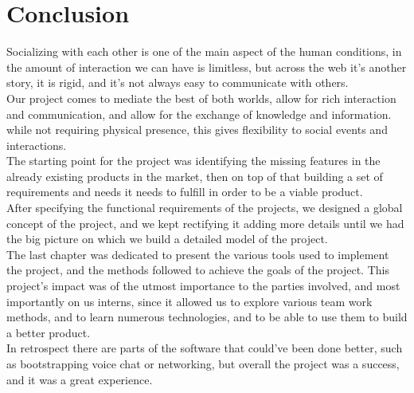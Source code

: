 
\chapter*{Conclusion}
\label{chap:conclusion}
%
  Socializing with each other is one of the main aspect of the human conditions, in the amount of interaction we can have is limitless,
  but across the web it's another story, it is rigid, and it's not always easy to communicate with others.\\
  Our project comes to mediate the best of both worlds, allow for rich interaction and communication, and allow for the exchange of knowledge and information.
  while not requiring physical presence, this gives flexibility to social events and interactions.\\
  The starting point for the project was identifying the missing features in the already existing products in the market, then on top of that building a 
  set of requirements and needs it needs to fulfill in order to be a viable product.\\
  After specifying the functional requirements of the projects, we designed a global concept of the project, 
  and we kept rectifying it adding more details until we had the big picture on which we build a detailed model of the project.\\
  The last chapter was dedicated to present the various tools used to implement the project, and the methods followed to achieve the goals of the project.
  This project's impact was of the utmost importance to the parties involved, and most importantly on us interns, since it allowed us to explore various team work methods,
  and to learn numerous technologies, and to be able to use them to build a better product.\\
  In retrospect there are parts of the software that could've been done better, such as bootstrapping voice chat or networking, but overall the project was a success, and it was a great experience. 